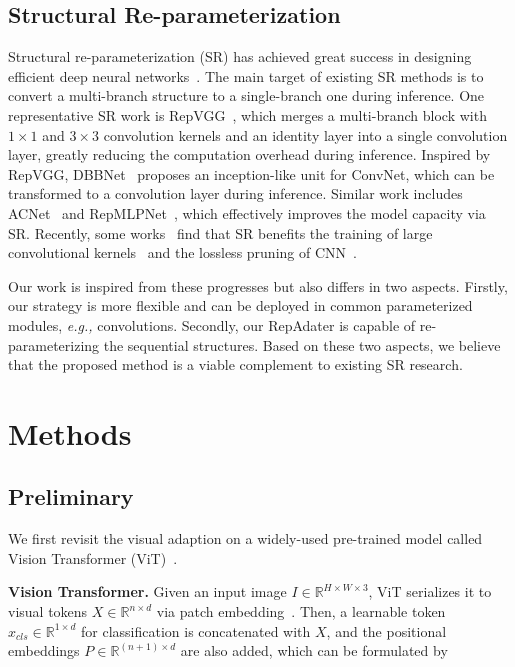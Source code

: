 \subsection{Structural  Re-parameterization} Structural re-parameterization (SR) has achieved great success in designing efficient deep neural networks~\cite{repvgg,resrep,replknet,repmlp}.   The main target of existing SR methods is to  convert a   multi-branch structure to a single-branch one  during inference. One representative SR work  is RepVGG~\cite{repvgg}, which  merges a multi-branch block  with  $1\times1$ and $3\times3$ convolution  kernels  and an identity layer into a single convolution layer, greatly reducing the computation overhead   during inference.  Inspired  by RepVGG, DBBNet~\cite{dbbnet} proposes an inception-like unit for ConvNet, which can be transformed to a convolution layer during inference. Similar work includes ACNet~\cite{acnet} and RepMLPNet~\cite{repmlp},  which  effectively improves the model capacity via SR. Recently, some works~\cite{resrep,replknet}  find that SR   benefits the training of large convolutional kernels~\cite{replknet} and the lossless pruning of CNN~\cite{resrep}. 

Our work is   inspired from these progresses but also differs in two aspects.  Firstly, our strategy is more flexible and can be deployed in common parameterized modules, \emph{e.g.,} convolutions. Secondly,  our RepAdater is capable of re-parameterizing the sequential structures. Based on these two aspects, we believe that the proposed method is a viable complement to existing SR research.

\section{Methods}
\subsection{Preliminary}
We first revisit the visual adaption on a widely-used pre-trained model called Vision Transformer (ViT)~\cite{vit}. 

\textbf{Vision Transformer.} Given an input image $I \in \mathbb{R}^{H \times W \times 3}$,  ViT serializes it to visual tokens $X \in \mathbb{R}^{n \times d}$ via patch embedding~\cite{vit}. Then, a learnable token $x_{cls}  \in \mathbb{R}^{1 \times d}$  for classification is concatenated with $X$, and the positional embeddings $P  \in \mathbb{R}^{(n+1) \times d}$ are  also added, which can be formulated by

